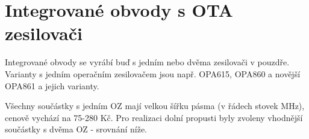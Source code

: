\documentclass[twoside]{article}
\begin{document}
\section{Integrované obvody s OTA zesilovači}
Integrované obvody se vyrábí buď s jedním nebo dvěma zesilovači v pouzdře. Varianty s jedním operačním zesilovačem jsou např. OPA615, OPA860 a novější OPA861 a jejich varianty. 
\renewcommand{\arraystretch}{1.5}
\begin{table}[H]
  \caption{\label{tab:Porovnání IO s jedním transkonduktančním OZ }Porovnání IO s jedním transkonduktančním OZ  \cite{4}}
  \end{table}
\noindent Všechny součástky s jedním OZ mají velkou šířku pásma (v řádech stovek MHz), cenově vychází na 75-280 Kč. Pro realizaci dolní propusti byly zvoleny vhodnější součástky s dvěma OZ - srovnání níže.
\end{document}
